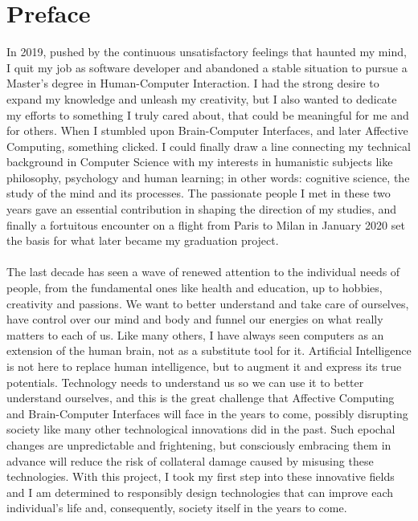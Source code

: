 \chapter{Preface }
\pagestyle{headings}

In 2019, pushed by the continuous unsatisfactory feelings that haunted my mind, I quit my job as software developer and abandoned a stable situation to pursue a Master's degree in Human-Computer Interaction. I had the strong desire to expand my knowledge and unleash my creativity, but I also wanted to dedicate my efforts to something I truly cared about, that could be meaningful for me and for others. When I stumbled upon Brain-Computer Interfaces, and later Affective Computing, something clicked. I could finally draw a line connecting my technical background in Computer Science with my interests in humanistic subjects like philosophy, psychology and human learning; in other words: cognitive science, the study of the mind and its processes. The passionate people I met in these two years gave an essential contribution in shaping the direction of my studies, and finally a fortuitous encounter on a flight from Paris to Milan in January 2020 set the basis for what later became my graduation project. 
\\
\\
The last decade has seen a wave of renewed attention to the individual needs of people, from the fundamental ones like health and education, up to hobbies, creativity and passions. We want to better understand and take care of ourselves, have control over our mind and body and funnel our energies on what really matters to each of us. Like many others, I have always seen computers as an extension of the human brain, not as a substitute tool for it. Artificial Intelligence is not here to replace human intelligence, but to augment it and express its true potentials. Technology needs to understand us so we can use it to better understand ourselves, and this is the great challenge that Affective Computing and Brain-Computer Interfaces will face in the years to come, possibly disrupting society like many other technological innovations did in the past. Such epochal changes are unpredictable and frightening, but consciously embracing them in advance will reduce the risk of collateral damage caused by misusing these technologies. With this project, I took my first step into these innovative fields and I am determined to responsibly design technologies that can improve each individual's life and, consequently, society itself in the years to come.
\\
